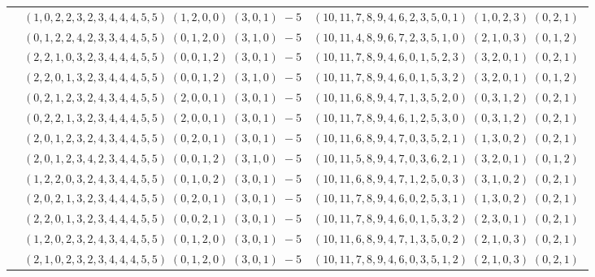 \documentclass[11pt]{article}
\begin{document}
\begin{longtable}[l]{|c|c|c|}
 \cline{2-3} 
 & $(1 ,0 ,2 ,2 ,3 ,2 ,3 ,4 ,4 ,4 ,5 ,5) \;(1 ,2 ,0 ,0) \;(3 ,0 ,1) \;-5$ & $(10 ,11 ,7 ,8 ,9 ,4 ,6 ,2 ,3 ,5 ,0 ,1) \;(1 ,0 ,2 ,3) \;(0 ,2 ,1) \;$\\ 
 \cline{2-3} 
 & $(0 ,1 ,2 ,2 ,4 ,2 ,3 ,3 ,4 ,4 ,5 ,5) \;(0 ,1 ,2 ,0) \;(3 ,1 ,0) \;-5$ & $(10 ,11 ,4 ,8 ,9 ,6 ,7 ,2 ,3 ,5 ,1 ,0) \;(2 ,1 ,0 ,3) \;(0 ,1 ,2) \;$\\ 
 \cline{2-3} 
 & $(2 ,2 ,1 ,0 ,3 ,2 ,3 ,4 ,4 ,4 ,5 ,5) \;(0 ,0 ,1 ,2) \;(3 ,0 ,1) \;-5$ & $(10 ,11 ,7 ,8 ,9 ,4 ,6 ,0 ,1 ,5 ,2 ,3) \;(3 ,2 ,0 ,1) \;(0 ,2 ,1) \;$\\ 
 \cline{2-3} 
 & $(2 ,2 ,0 ,1 ,3 ,2 ,3 ,4 ,4 ,4 ,5 ,5) \;(0 ,0 ,1 ,2) \;(3 ,1 ,0) \;-5$ & $(10 ,11 ,7 ,8 ,9 ,4 ,6 ,0 ,1 ,5 ,3 ,2) \;(3 ,2 ,0 ,1) \;(0 ,1 ,2) \;$\\ 
 \cline{2-3} 
 & $(0 ,2 ,1 ,2 ,3 ,2 ,4 ,3 ,4 ,4 ,5 ,5) \;(2 ,0 ,0 ,1) \;(3 ,0 ,1) \;-5$ & $(10 ,11 ,6 ,8 ,9 ,4 ,7 ,1 ,3 ,5 ,2 ,0) \;(0 ,3 ,1 ,2) \;(0 ,2 ,1) \;$\\ 
 \cline{2-3} 
 & $(0 ,2 ,2 ,1 ,3 ,2 ,3 ,4 ,4 ,4 ,5 ,5) \;(2 ,0 ,0 ,1) \;(3 ,0 ,1) \;-5$ & $(10 ,11 ,7 ,8 ,9 ,4 ,6 ,1 ,2 ,5 ,3 ,0) \;(0 ,3 ,1 ,2) \;(0 ,2 ,1) \;$\\ 
 \cline{2-3} 
 & $(2 ,0 ,1 ,2 ,3 ,2 ,4 ,3 ,4 ,4 ,5 ,5) \;(0 ,2 ,0 ,1) \;(3 ,0 ,1) \;-5$ & $(10 ,11 ,6 ,8 ,9 ,4 ,7 ,0 ,3 ,5 ,2 ,1) \;(1 ,3 ,0 ,2) \;(0 ,2 ,1) \;$\\ 
 \cline{2-3} 
 & $(2 ,0 ,1 ,2 ,3 ,4 ,2 ,3 ,4 ,4 ,5 ,5) \;(0 ,0 ,1 ,2) \;(3 ,1 ,0) \;-5$ & $(10 ,11 ,5 ,8 ,9 ,4 ,7 ,0 ,3 ,6 ,2 ,1) \;(3 ,2 ,0 ,1) \;(0 ,1 ,2) \;$\\ 
 \cline{2-3} 
 & $(1 ,2 ,2 ,0 ,3 ,2 ,4 ,3 ,4 ,4 ,5 ,5) \;(0 ,1 ,0 ,2) \;(3 ,0 ,1) \;-5$ & $(10 ,11 ,6 ,8 ,9 ,4 ,7 ,1 ,2 ,5 ,0 ,3) \;(3 ,1 ,0 ,2) \;(0 ,2 ,1) \;$\\ 
 \cline{2-3} 
 & $(2 ,0 ,2 ,1 ,3 ,2 ,3 ,4 ,4 ,4 ,5 ,5) \;(0 ,2 ,0 ,1) \;(3 ,0 ,1) \;-5$ & $(10 ,11 ,7 ,8 ,9 ,4 ,6 ,0 ,2 ,5 ,3 ,1) \;(1 ,3 ,0 ,2) \;(0 ,2 ,1) \;$\\ 
 \cline{2-3} 
 & $(2 ,2 ,0 ,1 ,3 ,2 ,3 ,4 ,4 ,4 ,5 ,5) \;(0 ,0 ,2 ,1) \;(3 ,0 ,1) \;-5$ & $(10 ,11 ,7 ,8 ,9 ,4 ,6 ,0 ,1 ,5 ,3 ,2) \;(2 ,3 ,0 ,1) \;(0 ,2 ,1) \;$\\ 
 \cline{2-3} 
 & $(1 ,2 ,0 ,2 ,3 ,2 ,4 ,3 ,4 ,4 ,5 ,5) \;(0 ,1 ,2 ,0) \;(3 ,0 ,1) \;-5$ & $(10 ,11 ,6 ,8 ,9 ,4 ,7 ,1 ,3 ,5 ,0 ,2) \;(2 ,1 ,0 ,3) \;(0 ,2 ,1) \;$\\ 
 \cline{2-3} 
 & $(2 ,1 ,0 ,2 ,3 ,2 ,3 ,4 ,4 ,4 ,5 ,5) \;(0 ,1 ,2 ,0) \;(3 ,0 ,1) \;-5$ & $(10 ,11 ,7 ,8 ,9 ,4 ,6 ,0 ,3 ,5 ,1 ,2) \;(2 ,1 ,0 ,3) \;(0 ,2 ,1) \;$\\ 

\end{longtable}
\end{document}
